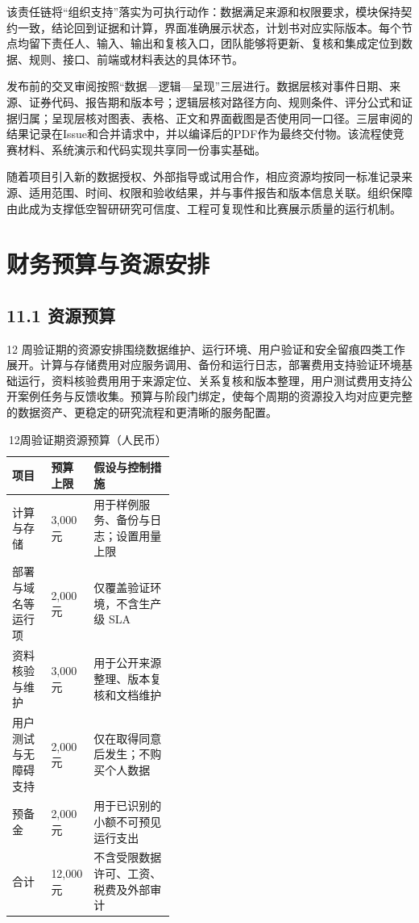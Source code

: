 该责任链将“组织支持”落实为可执行动作：数据满足来源和权限要求，模块保持契约一致，结论回到证据和计算，界面准确展示状态，计划书对应实际版本。每个节点均留下责任人、输入、输出和复核入口，团队能够将更新、复核和集成定位到数据、规则、接口、前端或材料表达的具体环节。

发布前的交叉审阅按照“数据—逻辑—呈现”三层进行。数据层核对事件日期、来源、证券代码、报告期和版本号；逻辑层核对路径方向、规则条件、评分公式和证据归属；呈现层核对图表、表格、正文和界面截图是否使用同一口径。三层审阅的结果记录在Issue和合并请求中，并以编译后的PDF作为最终交付物。该流程使竞赛材料、系统演示和代码实现共享同一份事实基础。

随着项目引入新的数据授权、外部指导或试用合作，相应资源均按同一标准记录来源、适用范围、时间、权限和验收结果，并与事件报告和版本信息关联。组织保障由此成为支撑低空智研研究可信度、工程可复现性和比赛展示质量的运行机制。


\section{财务预算与资源安排}
\subsection*{11.1 资源预算}\label{page:44}

12 周验证期的资源安排围绕数据维护、运行环境、用户验证和安全留痕四类工作展开。计算与存储费用对应服务调用、备份和运行日志，部署费用支持验证环境基础运行，资料核验费用用于来源定位、关系复核和版本整理，用户测试费用支持公开案例任务与反馈收集。预算与阶段门绑定，使每个周期的资源投入均对应更完整的数据资产、更稳定的研究流程和更清晰的服务配置。

\begin{table}[!htbp]
\centering
\caption{12周验证期资源预算（人民币）}
\label{tab:wty-budget}
\small
\begin{tabularx}{\linewidth}{p{0.24\linewidth}p{0.16\linewidth}X}
\toprule
项目 & 预算上限 & 假设与控制措施 \\
\midrule
计算与存储 & 3,000 元 & 用于样例服务、备份与日志；设置用量上限 \\
部署与域名等运行项 & 2,000 元 & 仅覆盖验证环境，不含生产级 SLA \\
资料核验与维护 & 3,000 元 & 用于公开来源整理、版本复核和文档维护 \\
用户测试与无障碍支持 & 2,000 元 & 仅在取得同意后发生；不购买个人数据 \\
预备金 & 2,000 元 & 用于已识别的小额不可预见运行支出 \\
\midrule
合计 & 12,000 元 & 不含受限数据许可、工资、税费及外部审计 \\
\bottomrule
\end{tabularx}
\end{table}


